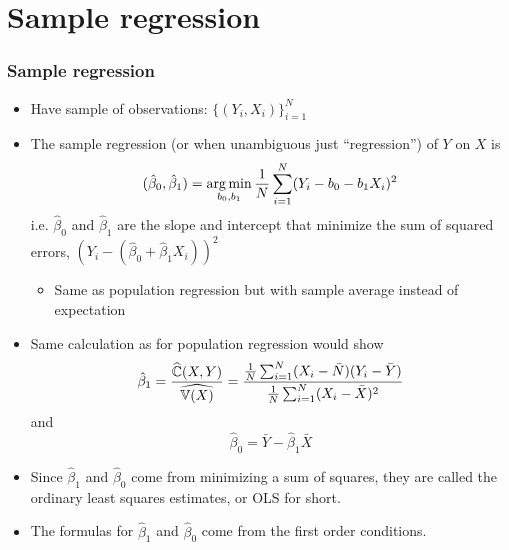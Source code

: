 \section{Sample regression}
\begin{frame}[allowframebreaks] \frametitle{Sample regression}
  \begin{itemize}
  \item Have sample of observations: $\{ (Y_i, X_i) \}_{i=1}^N$ 
  \item The \alert{sample regression} (or when unambiguous just
    ``regression'') of $Y$ on $X$ is 
    \[ (\hat{\beta}_0, \hat{\beta}_1) = \argmin_{b_0,b_1}
    \frac{1}{N}\sum_{i=1}^N (Y_i - b_0 - b_1 X_i)^2 \] 
    i.e. $\hat{\beta}_0$ and $\hat{\beta}_1$ are the slope and intercept that
    minimize the sum of squared errors, $(Y_i - (\hat{\beta}_0 + \hat{\beta}_1 X_i))^2$ 
    \begin{itemize}
    \item Same as population regression but with sample average
      instead of expectation
    \end{itemize}
  \item Same calculation as for population regression would show
    \[ \hat{\beta}_1 = \frac{\widehat{\mathbb{C}}(X,Y)}{\widehat{\mathbb{V}(X)}} =
    \frac{\frac{1}{N} \sum_{i=1}^N (X_i -\bar{N})(Y_i - \bar{Y})}
    {\frac{1}{N} \sum_{i=1}^N (X_i - \bar{X})^2} \]
    and 
    \[ \hat{\beta}_0 = \bar{Y} - \hat{\beta}_1 \bar{X} \]
 

\framebreak

\item Since $\hat{\beta}_1$ and $\hat{\beta}_0$ come from minimizing a sum
of squares, they are called the ordinary least squares estimates, or
OLS for short. 

\item The formulas for $\hat{\beta}_1$ and $\hat{\beta}_0$ come from the
first order conditions.  


\end{itemize}
\end{frame}
